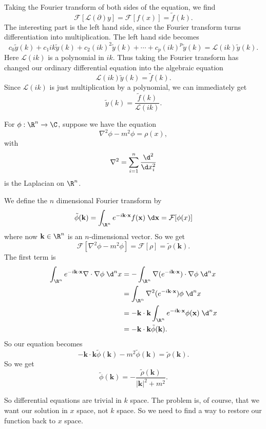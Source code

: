 \documentclass[a4paper]{article}
\begin{document}
Taking the Fourier transform of both sides of the equation, we find
\[
  \mathcal{F}[\mathcal{L}(\partial)y] = \mathcal{F}[f(x)] = \tilde{f}(k).
\]
The interesting part is the left hand side, since the Fourier transform turns differentiation into multiplication. The left hand side becomes
\[
  c_0 \tilde{y}(k) + c_1 ik\tilde{y}(k) + c_2 (ik)^2 \tilde{y}(k) + \cdots + c_p (ik)^p \tilde{y}(k) = \mathcal{L}(ik) \tilde{y}(k).
\]
Here $\mathcal{L}(ik)$ is a polynomial in $ik$. Thus taking the Fourier transform has changed our ordinary differential equation into the algebraic equation
\[
  \mathcal{L}(ik) \tilde{y}(k) = \tilde{f}(k).
\]
Since $\mathcal{L}(ik)$ is just multiplication by a polynomial, we can immediately get
\[
  \tilde{y}(k) = \frac{\tilde{f}(k)}{\mathcal{L}(ik)}.
\]
\begin{eg}
  For $\phi: \R^n \to \C$, suppose we have the equation
  \[
    \nabla^2 \phi - m^2 \phi = \rho(x),
  \]
  with
  \[
    \nabla^2 = \sum_{i = 1}^n \frac{\d^2}{\d x_i^2}
  \]
  is the Laplacian on $\R^n$.

  We define the $n$ dimensional Fourier transform by
  \[
    \tilde{\phi} (\mathbf{k}) = \int_{\R^n} e^{-i\mathbf{k}\cdot \mathbf{x}} f(\mathbf{x})\;\d \mathbf{x} = \mathcal{F}[\phi(x)]
  \]
  where now $\mathbf{k} \in \R^n$ is an $n$-dimensional vector. So we get
  \[
    \mathcal{F}[\nabla^2 \phi - m^2 \phi] = \mathcal{F}[\rho] = \tilde{\rho}(\mathbf{k}).
  \]
  The first term is
  \begin{align*}
    \int_{\R^n} e^{-i\mathbf{k}\cdot \mathbf{x}} \nabla\cdot \nabla \phi \;\d ^n x &= -\int_{\R^n} \nabla (e^{-i\mathbf{k}\cdot \mathbf{x}}) \cdot \nabla \phi \;\d^n x\\
    &= \int_{\R^n} \nabla^2 (e^{-i\mathbf{k}\cdot \mathbf{x}}) \phi \;\d^n x\\
    &= -\mathbf{k}\cdot \mathbf{k} \int_{\R^n} e^{-i\mathbf{k}\cdot \mathbf{x}} \phi(\mathbf{x})\;\d^n x\\
    &= -\mathbf{k}\cdot \mathbf{k} \tilde{\phi} (\mathbf{k}).
  \end{align*}
  So our equation becomes
  \[
    -\mathbf{k}\cdot \mathbf{k} \tilde{\phi}(\mathbf{k}) - m^2 \tilde{\phi}(\mathbf{k}) = \tilde{\rho}(\mathbf{k}).
  \]
  So we get
  \[
    \tilde{\phi}(\mathbf{k}) = -\frac{\tilde{\rho}(\mathbf{k})}{|\mathbf{k}|^2 + m^2}.
  \]
\end{eg}
So differential equations are trivial in $k$ space. The problem is, of course, that we want our solution in $x$ space, not $k$ space. So we need to find a way to restore our function back to $x$ space.
\end{document}
